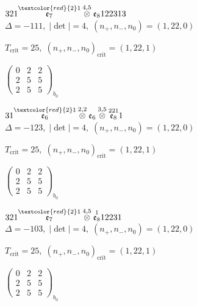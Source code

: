 \documentclass[10pt]{article}
\begin{document}
\smallskip

$321\overset{\textcolor{red}{2}1}{\mathfrak{e}_7}\overset{4,5}{\otimes}\mathfrak{e}_8122313$ \quad $\Delta=-111,\; |\det|=4,\; (n_+,n_-,n_0)=(1,22,0)$

\hspace{1em}$T_{\text{crit}}=25,\; (n_+,n_-,n_0)_{\text{crit}}=(1,22,1)$

\hspace{2em}$\left(\begin{smallmatrix}0 & 2 & 2 \\ 2 & 5 & 5 \\ 2 & 5 & 5\end{smallmatrix}\right)_{\!b_0}$

\smallskip

$31\overset{\textcolor{red}{2}1}{\mathfrak{e}_6}\overset{2,2}{\otimes}\mathfrak{e}_6\overset{3,5}{\otimes}\overset{221}{\mathfrak{e}_8}1$ \quad $\Delta=-123,\; |\det|=4,\; (n_+,n_-,n_0)=(1,22,0)$

\hspace{1em}$T_{\text{crit}}=25,\; (n_+,n_-,n_0)_{\text{crit}}=(1,22,1)$

\hspace{2em}$\left(\begin{smallmatrix}0 & 2 & 2 \\ 2 & 5 & 5 \\ 2 & 5 & 5\end{smallmatrix}\right)_{\!b_0}$

\smallskip

$321\overset{\textcolor{red}{2}1}{\mathfrak{e}_7}\overset{4,5}{\otimes}\overset{1}{\mathfrak{e}_8}12231$ \quad $\Delta=-103,\; |\det|=4,\; (n_+,n_-,n_0)=(1,22,0)$

\hspace{1em}$T_{\text{crit}}=25,\; (n_+,n_-,n_0)_{\text{crit}}=(1,22,1)$

\hspace{2em}$\left(\begin{smallmatrix}0 & 2 & 2 \\ 2 & 5 & 5 \\ 2 & 5 & 5\end{smallmatrix}\right)_{\!b_0}$
\end{document}
